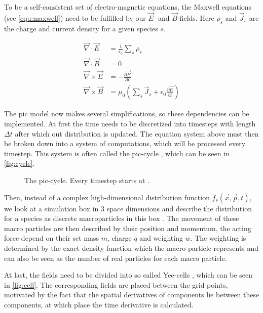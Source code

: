 \documentclass[bachelor_thesis]{subfiles}
\begin{document}
To be a self-consistent set of electro-magnetic equations, the Maxwell equations (see \autoref{equ:maxwell}) need to be fulfilled by our $\vec{E}$- and $\vec{B}$-fields. Here $\rho_s$ and $\vec{J}_s$ are the charge and current density for a given species $s$.

\begin{equation}
\begin{aligned}
	\vec{\nabla}\cdot\vec{E}  &= \frac{1}{\epsilon_0}\sum_s \rho_s 									\\
	\vec{\nabla}\cdot\vec{B}  &= 0 														\\
	\vec{\nabla}\times\vec{E} &= -\frac{\partial \vec{B}}{\partial t}									\\
	\vec{\nabla}\times\vec{B}&= \mu_0 \left(\sum_s \vec{J}_s + \epsilon_0 \frac{\partial \vec{E}}{\partial t}\right)	
\end{aligned}
\label{equ:maxwell}
\end{equation}

The \gls{pic} model now makes several simplifications, so these dependencies can be implemented.
At first the time needs to be discretized into timesteps with length $\Delta t$ after which out distribution is updated. The equation system above must then be broken down into a system of computations, which will be processed every timestep.
This system is often called the \gls{pic}-cycle \cite{Huebl2019}, which can be seen in \autoref{fig:cycle}.

\begin{figure}
	\centering
	\missingfigure{}
	\caption{The \gls{pic}-cycle. Every timestep starts at .}
	\label{fig:cycle}
\end{figure}

Then, instead of a complex high-dimensional distribution function $f_s(\vec{x}, \vec{p}, t)$, we look at a simulation box in 3 space dimensions and describe the distribution for a species as discrete macroparticles in this box \cite{Burau2010}.
The movement of these macro particles are then described by their position and momentum, the acting force depend on their set mass $m$, charge $q$ and weighting $w$.
The weighting is determined by the exact density function which the macro particle represents and can also be seen as the number of real particles for each macro particle.


At last, the fields need to be divided into so called Yee-cells \cite{Yee1966}, which can be seen in \autoref{fig:cell}. The corresponding fields are placed between the grid points, motivated by the fact that the spatial derivatives of components lie between these components, 
at which place the time derivative is calculated.
\end{document}
